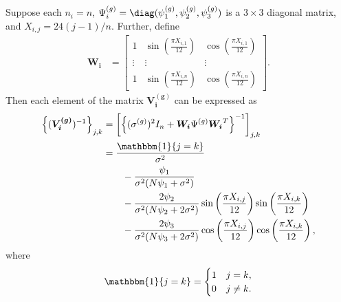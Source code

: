 \begin{lemma} \label{lem:2}
Suppose each $n_i = n$, $\Psi^{(g)}_i= \diag(\psi^{(g)}_1, \psi^{(g)}_2, \psi^{(g)}_3)$ is a $3\times 3$ diagonal matrix, and $X_{i,j} = 24(j-1)/n$. Further, define 
\begin{align*}
    \boldsymbol{W_i} &= \begin{bmatrix}1 & \sin\left(\frac{\pi X_{i,1}}{12}\right) & \cos\left(\frac{\pi X_{i,1}}{12}\right) \\
    \vdots & \vdots & \vdots \\
    1 & \sin\left(\frac{\pi X_{i,n}}{12}\right) & \cos\left(\frac{\pi X_{i,n}}{12}\right)
    \end{bmatrix}.
\end{align*}
Then each element of the matrix $\boldsymbol{V^{(g)}_i}$ can be expressed as
\begin{align*}
    \left\{(\boldsymbol{V^{(g)}_i})^{-1}\right\}_{j,k} &= \left[\left\{(\sigma^{(g)})^2I_{n} + \boldsymbol{W_i}\Psi^{(g)} \boldsymbol{W_i}^T\right\}^{-1}\right]_{j,k} \\
     &= \frac{\mathbbm{1}\{j=k\}}{\sigma^2} \\
     &\quad \quad - \frac{\psi_1}{\sigma^2(N\psi_1+\sigma^2)} \\
     & \quad \quad - \frac{2\psi_2}{\sigma^2(N\psi_2+2\sigma^2)}\sin\left(\frac{\pi X_{i,j}}{12}\right)\sin\left(\frac{\pi X_{i,k}}{12}\right) \\
     & \quad \quad - \frac{2\psi_3}{\sigma^2(N\psi_3+2\sigma^2)}\cos\left(\frac{\pi X_{i,j}}{12}\right)\cos\left(\frac{\pi X_{i,k}}{12}\right),
\end{align*}
where 
\begin{equation*}
    \mathbbm{1}\{j=k\} =  \begin{cases} 
      1 & j=k, \\
      0 & j\neq k.
   \end{cases}
\end{equation*}
\end{lemma}

